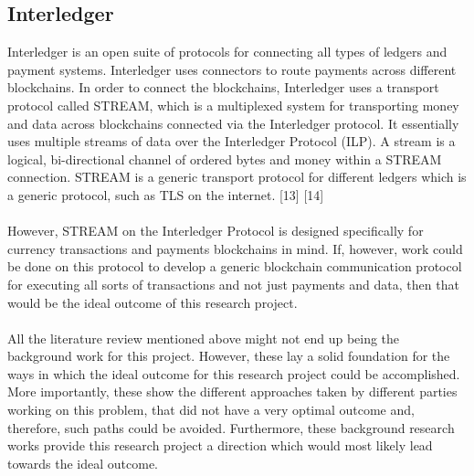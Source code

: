 \documentclass[a4paper,twoside,phd]{BYUPhys}
\begin{document}
\subsection{Interledger}
Interledger is an open suite of protocols for connecting all types of ledgers and payment systems. Interledger uses connectors to route payments across different blockchains. In order to connect the blockchains, Interledger uses a transport protocol called STREAM, which is a multiplexed system for transporting money and data across blockchains connected via the Interledger protocol. It essentially uses multiple streams of data over the Interledger Protocol (ILP). A stream is a logical, bi-directional channel of ordered bytes and money within a STREAM connection. STREAM is a generic transport protocol for different ledgers which is a generic protocol, such as TLS on the internet. [13] [14]
\\
\\
However, STREAM on the Interledger Protocol is designed specifically for currency transactions and payments blockchains in mind. If, however, work could be done on this protocol to develop a generic blockchain communication protocol for executing all sorts of transactions and not just payments and data, then that would be the ideal outcome of this research project.
\\
\\
All the literature review mentioned above might not end up being the background work for this project. However, these lay a solid foundation for the ways in which the ideal outcome for this research project could be accomplished. More importantly, these show the different approaches taken by different parties working on this problem, that did not have a very optimal outcome and, therefore, such paths could be avoided. Furthermore, these background research works provide this research project a direction which would most likely lead towards the ideal outcome.
\end{document}

